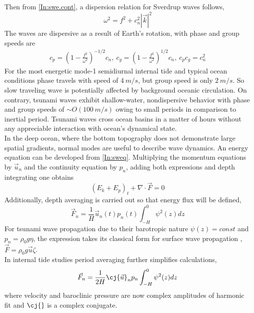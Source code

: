 \documentclass[12pt]{article}
\begin{document}
Then from \eqref{In:swe.cont}, a dispersion relation for Sverdrup waves follows,
\begin{equation}
\omega^2 = f^2 + c^2_n |\vec{k}|^2
\end{equation}
The waves are dispersive as a result of Earth's rotation, with phase and group speeds are
\begin{align}
c_{p} = (1 - \frac{f^2}{\omega^2})^{-1/2} c_n,~c_g = (1 - \frac{f^2}{\omega^2})^{1/2} c_n,~c_p c_g 
= c_n^2
\end{align}
For the most energetic mode-1 semidiurnal internal tide and typical ocean conditions phase travels 
with speed of $4~m/s$, but group speed is only $2~m/s$. So slow traveling wave is potentially 
affected by background oceanic circulation. On contrary, tsunami waves exhibit shallow-water, 
nondispersive behavior with phase and group speeds of $\sim O(100~m/s)$ owing to small periods in 
comparison to inertial period. Tsunami waves cross ocean basins in a matter of hours without any 
appreciable interaction with ocean's dynamical state.\\
In the deep ocean, where the bottom topography does not demonstrate large spatial gradients, normal 
modes are useful to describe wave dynamics. An energy equation can be developed from 
\eqref{In:sweq}. Multiplying the momentum equations by $\vec{u}_n$ and the continuity equation by 
$p_n$, adding both expressions and depth integrating one obtains
\begin{equation}
(E_k + E_p)_t + \nabla \cdot \vec{F} = 0 \label{In:eneq}
\end{equation}
Additionally, depth averaging is carried out so that energy flux will be defined,
\begin{equation}
\vec{F}_n = \frac{1}{H} \vec{u}_n(t) p_n(t) \int_{-H}^0 \psi^2(z) dz \label{In:fldef}
\end{equation}
For tsunami wave propagation due to their barotropic nature $\psi(z) = const$ and $p_n = \rho_0 g 
\eta$, the expression takes its classical form for surface wave propagation 
\citep{henry2001representation}, $\vec{F} = \rho_0 g \vec{u} \zeta$.\\
In internal tide studies period averaging further simplifies calculations,
\begin{align}
\vec{F}_n = \frac{1}{2H} \cj{\vec{u}}_n p_n \int_{-H}^0 \psi^2(z) dz
\end{align}
where velocity and baroclinic pressure are now complex amplitudes of harmonic fit and $\cj{}$ is a 
complex conjugate.\\
\end{document}

